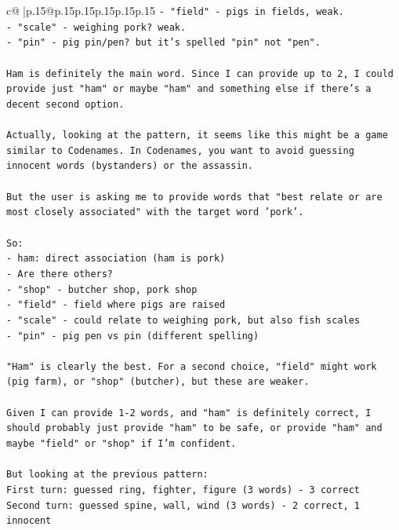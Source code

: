 \documentclass{article}
\begin{document}
{\begin{supertabular}{c@{$\;$}|p{.15\linewidth}@{}p{.15\linewidth}p{.15\linewidth}p{.15\linewidth}p{.15\linewidth}p{.15\linewidth}}
{{{\texttt{{-} "field" {-} pigs in fields, weak.} \\
\texttt{{-} "scale" {-} weighing pork? weak.} \\
\texttt{{-} "pin" {-} pig pin/pen? but it's spelled "pin" not "pen".} \\
\\ 
\texttt{Ham is definitely the main word. Since I can provide up to 2, I could provide just "ham" or maybe "ham" and something else if there's a decent second option.} \\
\\ 
\texttt{Actually, looking at the pattern, it seems like this might be a game similar to Codenames. In Codenames, you want to avoid guessing innocent words (bystanders) or the assassin.} \\
\\ 
\texttt{But the user is asking me to provide words that "best relate or are most closely associated" with the target word 'pork'.} \\
\\ 
\texttt{So:} \\
\texttt{{-} ham: direct association (ham is pork)} \\
\texttt{{-} Are there others?} \\
\texttt{{-} "shop" {-} butcher shop, pork shop} \\
\texttt{{-} "field" {-} field where pigs are raised} \\
\texttt{{-} "scale" {-} could relate to weighing pork, but also fish scales} \\
\texttt{{-} "pin" {-} pig pen vs pin (different spelling)} \\
\\ 
\texttt{"Ham" is clearly the best. For a second choice, "field" might work (pig farm), or "shop" (butcher), but these are weaker. } \\
\\ 
\texttt{Given I can provide 1{-}2 words, and "ham" is definitely correct, I should probably just provide "ham" to be safe, or provide "ham" and maybe "field" or "shop" if I'm confident.} \\
\\ 
\texttt{But looking at the previous pattern:} \\
\texttt{First turn: guessed ring, fighter, figure (3 words) {-} 3 correct} \\
\texttt{Second turn: guessed spine, wall, wind (3 words) {-} 2 correct, 1 innocent} \\
\\ 
}}}
\end{supertabular}}
\end{document}
